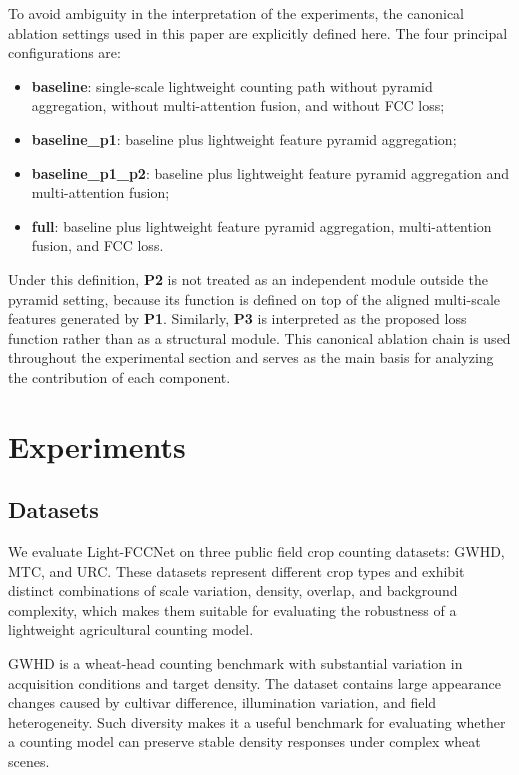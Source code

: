 \documentclass[a4paper,fleqn]{cas-sc}
\begin{document}
To avoid ambiguity in the interpretation of the experiments, the canonical ablation settings used in this paper are explicitly defined here. The four principal configurations are:
\begin{itemize}
    \item \textbf{baseline}: single-scale lightweight counting path without pyramid aggregation, without multi-attention fusion, and without FCC loss;
    \item \textbf{baseline\_p1}: baseline plus lightweight feature pyramid aggregation;
    \item \textbf{baseline\_p1\_p2}: baseline plus lightweight feature pyramid aggregation and multi-attention fusion;
    \item \textbf{full}: baseline plus lightweight feature pyramid aggregation, multi-attention fusion, and FCC loss.
\end{itemize}

Under this definition, \textbf{P2} is not treated as an independent module outside the pyramid setting, because its function is defined on top of the aligned multi-scale features generated by \textbf{P1}. Similarly, \textbf{P3} is interpreted as the proposed loss function rather than as a structural module. This canonical ablation chain is used throughout the experimental section and serves as the main basis for analyzing the contribution of each component.

\section{Experiments}

\subsection{Datasets}

We evaluate Light-FCCNet on three public field crop counting datasets: GWHD, MTC, and URC. These datasets represent different crop types and exhibit distinct combinations of scale variation, density, overlap, and background complexity, which makes them suitable for evaluating the robustness of a lightweight agricultural counting model.

GWHD is a wheat-head counting benchmark with substantial variation in acquisition conditions and target density. The dataset contains large appearance changes caused by cultivar difference, illumination variation, and field heterogeneity. Such diversity makes it a useful benchmark for evaluating whether a counting model can preserve stable density responses under complex wheat scenes.
\end{document}
